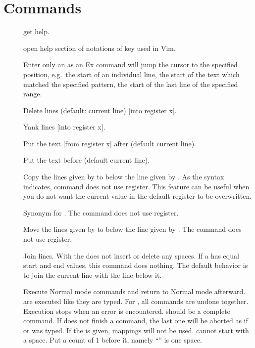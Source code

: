 \section{Commands}
\begin{description}
  \item[] get help.
  \item[] open help section of notations of key used in Vim.
  \item[] Enter only an  as an Ex command will jump the cursor to the specified position, e.g.\ the start of an individual line, the start of the text which matched the specified pattern, the start of the last line of the specified range.
  \item[] Delete \syntax{[range]} lines (default: current line) [into register x].
  \item[] Yank \syntax{[range]} lines [into register x].
  \item[] Put the text [from register x] after \syntax{[line]} (default current line).
  \item[] Put the text before \syntax{[line]}  (default current line).
  \item[] Copy the lines given by \syntax{[range]} to below the line given by .
 As the syntax indicates,  command does not use register. This feature can be useful when you do not want the current value in the default register to be overwritten.
  \item[] Synonym for . The command does not use register.

  \item[] Move the lines given by \syntax{[range]} to below the line given by . The command does not use register.
  \item[] Join \syntax{[range]} lines. With \syntax{[!]} the  does not insert or delete any spaces. If a \syntax{[range]} has equal start and end values, this command does nothing. The default behavior is to join the current line with the line below it.
  \item[] Execute Normal mode commands  and return to Normal mode afterward.  are executed like they are typed. For , all commands are undone together. Execution stops when an error is encountered.  should be a complete command. If  does not finish a command, the last one will be aborted as if  or  was typed. If the \syntax{[!]} is given, mappings will not be used.  cannot start with a space. Put a count of 1 before it, namely ``'' is one space.


\end{description}
